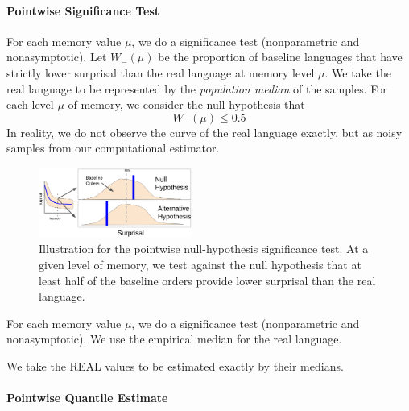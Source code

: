 \documentclass[11pt,letterpaper]{article}
\begin{document}


\paragraph{Pointwise Significance Test}
For each memory value $\mu$, we do a significance test (nonparametric and nonasymptotic).
Let $W_-(\mu)$ be the proportion of baseline languages that have strictly lower surprisal than the real language at memory level $\mu$.
We take the real language to be represented by the \emph{population median} of the samples.
For each level $\mu$ of memory, we consider the null hypothesis that
\begin{equation}
	W_-(\mu) \leq 0.5
\end{equation}
In reality, we do not observe the curve of the real language exactly, but as noisy samples from our computational estimator.

\begin{figure}
	\begin{center}
\includegraphics[width=0.45\textwidth]{figures/nhst.png}
\end{center}
	\caption{Illustration for the pointwise null-hypothesis significance test. At a given level of memory, we test against the null hypothesis that at least half of the baseline orders provide lower surprisal than the real language.}\label{fig:nhst-pointwise}
\end{figure}






For each memory value $\mu$, we do a significance test (nonparametric and nonasymptotic).
We use the empirical median for the real language.


We take the REAL values to be estimated exactly by their medians.



\paragraph{Pointwise Quantile Estimate}
\end{document}
